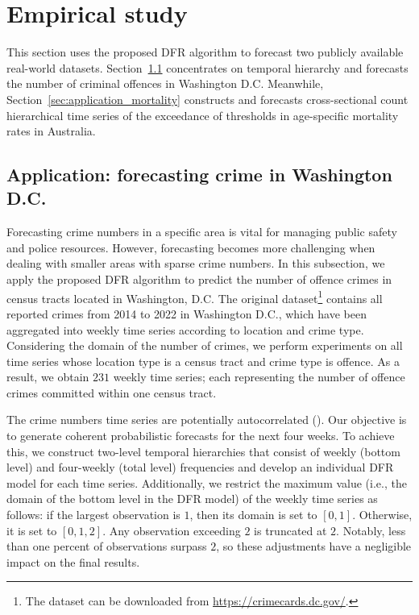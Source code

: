 \documentclass[a4paper,review,12pt,authoryear]{elsarticle}
\theoremstyle{definition}
\begin{document}
     \section{Empirical study}
     \label{sec:application}
     This section uses the proposed DFR algorithm to forecast two publicly available real-world datasets.
     Section~\ref{sec:application_crime} concentrates on temporal hierarchy and forecasts the number of criminal offences in Washington D.C.
     Meanwhile, Section~\ref{sec:application_mortality} constructs and forecasts cross-sectional count hierarchical time series of the exceedance of thresholds in age-specific mortality rates in Australia.

     \subsection{Application: forecasting crime in Washington D.C.}
     \label{sec:application_crime}

     Forecasting crime numbers in a specific area is vital for managing public safety and police resources.
     However, forecasting becomes more challenging when dealing with smaller areas with sparse crime numbers.
     In this subsection, we apply the proposed DFR algorithm to predict the number of offence crimes in census tracts located in Washington, D.C.
     The original dataset\footnote{The dataset can be downloaded from \url{https://crimecards.dc.gov/}.} contains all reported crimes from 2014 to 2022 in Washington D.C., which have been aggregated into weekly time series according to location and crime type.
     Considering the domain of the number of crimes, we perform experiments on all time series whose location type is a census tract and crime type is offence.
     As a result, we obtain $231$ weekly time series; each representing the number of offence crimes committed within one census tract.

     The crime numbers time series are potentially autocorrelated (\citealp{aldor-noimanSpatioTemporalLowCount2013}).
     Our objective is to generate coherent probabilistic forecasts for the next four weeks.
     To achieve this, we construct two-level temporal hierarchies that consist of weekly (bottom level) and four-weekly (total level) frequencies and develop an individual DFR model for each time series.
     Additionally, we restrict the maximum value (i.e., the domain of the bottom level in the DFR model) of the weekly time series as follows: if the largest observation is $1$, then its domain is set to $[0, 1]$.
     Otherwise, it is set to $[0, 1, 2]$.
     Any observation exceeding $2$ is truncated at $2$.
     Notably, less than one percent of observations surpass $2$, so these adjustments have a negligible impact on the final results.
\end{document}
